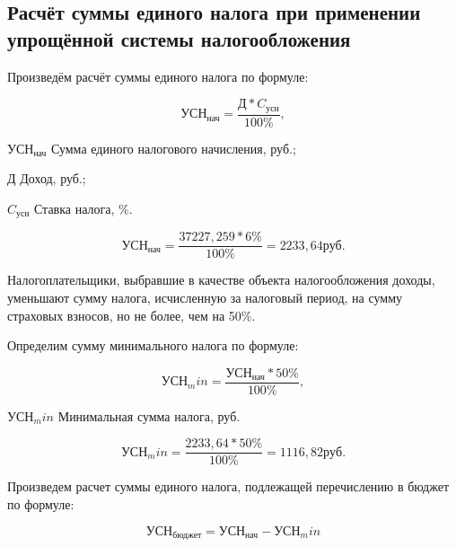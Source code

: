 \tocless\subsection{Расчёт суммы единого налога при применении упрощённой системы налогообложения}

Произведём расчёт суммы единого налога по формуле:

\begin{equation}
    \text{УСН}_\text{нач} = \frac{\text{Д} * C_\text{усн}}{100\%},
\end{equation}

\begin{eqexpl}[25mm]
    \item{$\text{УСН}_\text{нач}$} Сумма единого налогового начисления, руб.;
    \item{Д} Доход, руб.;
    \item{$C_\text{усн}$} Ставка налога, \%.
\end{eqexpl}

\begin{equation*}
    \text{УСН}_\text{нач} = \frac{37227,259 * 6\%}{100\%} = 2233,64 \text{руб}.
\end{equation*}

Налогоплательщики, выбравшие в качестве объекта налогообложения
доходы, уменьшают сумму налога, исчисленную за налоговый период, на
сумму страховых взносов, но не более, чем на 50\%.

Определим сумму минимального налога по формуле:

\begin{equation}
    \text{УСН}_min = \frac{\text{УСН}_\text{нач} * 50\%}{100\%},
\end{equation}

\begin{eqexpl}[25mm]
    \item{$\text{УСН}_min$} Минимальная сумма налога, руб.
\end{eqexpl}

\begin{equation*}
    \text{УСН}_min = \frac{2233,64 * 50\%}{100\%} = 1116,82 руб.
\end{equation*}

Произведем расчет суммы единого налога, подлежащей перечислению
в бюджет по формуле:

\begin{equation}
    \text{УСН}_\text{бюджет} = \text{УСН}_\text{нач} - \text{УСН}_min
\end{equation}

